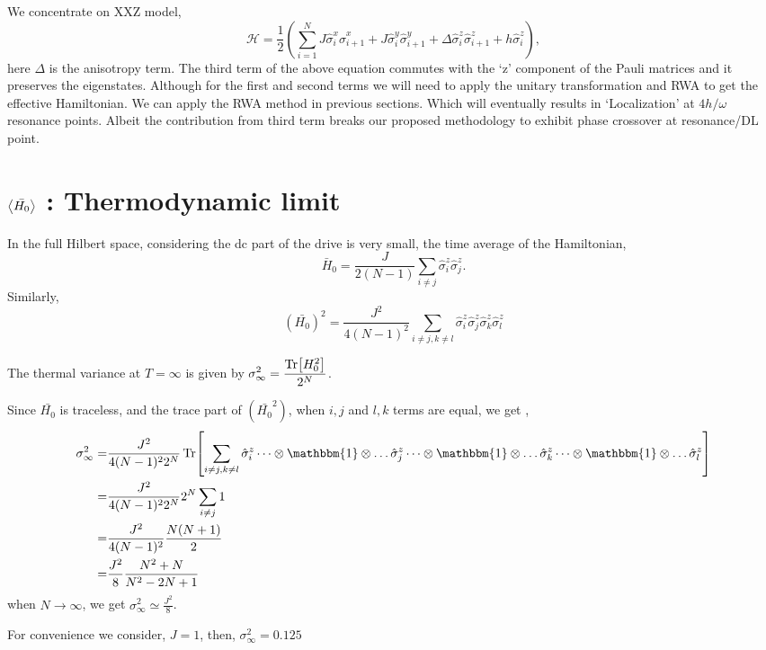 \documentclass[a4paper,11pt]{article}
\begin{document}
We concentrate on XXZ model,
\begin{equation}
	\mathcal{H} = \frac12 \left( \sum_{i=1}^N J \hat{\sigma}^x_i \hat{\sigma}^x_{i+1} +J  \hat{\sigma}^y_i \hat{\sigma}^y_{i+1} + \Delta \hat{\sigma}^z_i \hat{\sigma}^z_{i+1} + h  \hat{\sigma}^z_i\right),
\end{equation}
here $\Delta$ is the anisotropy term. The third term of the above equation commutes with the `z' component of the Pauli matrices and it preserves the eigenstates. 
Although for the first and second terms we will need to apply the unitary transformation and RWA to get the effective Hamiltonian. We can apply the RWA method in previous sections. Which will eventually results in `Localization' at $4h/\omega$ resonance points. Albeit the contribution from third term breaks our proposed methodology to exhibit phase crossover at resonance/DL point.

\section{$\expval{\bar{H_0}}$ : Thermodynamic limit}
In the full Hilbert space, considering the dc part of the drive is very small, the time average of the Hamiltonian,
\begin{equation*}
\bar{H}_0 = \frac{J}{2(N-1)}\sum_{i\neq j}\hat{\sigma}^z_i \hat{\sigma}^z_j.
\end{equation*}
Similarly,
\begin{equation}
	\left(\bar{H_0}\right)^2 = \frac{J^2}{4(N-1)^2}\sum_{i\neq j, k \neq l} \hat{\sigma}^z_i \hat{\sigma}^z_j \hat{\sigma}^z_k \hat{\sigma}^z_l
\end{equation}

The thermal variance at $T= \infty$ is given by $\displaystyle \sigma^2_{\infty} = \frac{\Tr[H^2_0]}{2^N}$. 

Since $\bar{H_0}$ is traceless, and the trace part of $\left(\bar{H_0}^2\right)$, when $i,j$ and $l,k$ terms are equal, we get ,
\begin{align*}
\sigma_\infty^2 =& \frac{J^2}{4(N-1)^2 2^N}\Tr[\sum_{i\neq j, k \neq l} \hat{\sigma}^z_i \dots\otimes \mathbbm{1} \otimes \dots \hat{\sigma}^z_j \dots\otimes \mathbbm{1} \otimes \dots \hat{\sigma}^z_k\dots\otimes \mathbbm{1} \otimes \dots \hat{\sigma}^z_l ]\\
=& \frac{J^2}{4(N-1)^2 2^N} 2^N \sum_{i\neq j} 1\\
=& \frac{J^2}{4(N-1)^2} \frac{N(N+1)}{2}\\
=& \frac{J^2}{8} \frac{N^2+N}{N^2-2N+1}
\end{align*}
when $N\rightarrow \infty$, we get $\displaystyle \sigma_\infty^2 \simeq \frac{J^2}{8}$. 

For convenience we consider, $J=1$, then, $\sigma_\infty^2 = 0.125$ 
\end{document}
